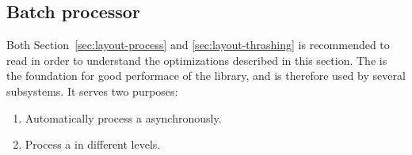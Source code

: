 \documentclass[a4paper,11pt]{kth-mag}
\begin{document}
      \subsection{Batch processor}\label{sec:imp_batch_processor}
        Both Section~\ref{sec:layout-process} and \ref{sec:layout-thrashing} is recommended to read in order to understand the optimizations described in this section.
        The  is the foundation for good performace of the library, and is therefore used by several subsystems.
        It serves two purposes:
        \begin{enumerate}
          \item Automatically process a  asynchronously.
          \item Process a  in different levels.
        \end{enumerate}
        
\end{document}
